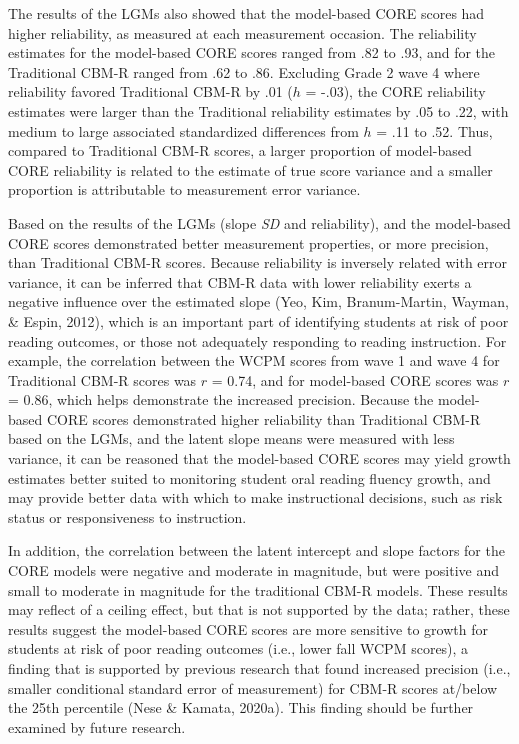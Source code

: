 \documentclass[
  english,
  man, fleqn, noextraspace]{apa6}
\begin{document}
The results of the LGMs also showed that the model-based CORE scores had higher reliability, as measured at each measurement occasion. The reliability estimates for the model-based CORE scores ranged from .82 to .93, and for the Traditional CBM-R ranged from .62 to .86. Excluding Grade 2 wave 4 where reliability favored Traditional CBM-R by .01 (\(h\) = -.03), the CORE reliability estimates were larger than the Traditional reliability estimates by .05 to .22, with medium to large associated standardized differences from \(h\) = .11 to .52. Thus, compared to Traditional CBM-R scores, a larger proportion of model-based CORE reliability is related to the estimate of true score variance and a smaller proportion is attributable to measurement error variance.

Based on the results of the LGMs (slope \emph{SD} and reliability), and the model-based CORE scores demonstrated better measurement properties, or more precision, than Traditional CBM-R scores. Because reliability is inversely related with error variance, it can be inferred that CBM-R data with lower reliability exerts a negative influence over the estimated slope (Yeo, Kim, Branum-Martin, Wayman, \& Espin, 2012), which is an important part of identifying students at risk of poor reading outcomes, or those not adequately responding to reading instruction. For example, the correlation between the WCPM scores from wave 1 and wave 4 for Traditional CBM-R scores was \(r\) = 0.74, and for model-based CORE scores was \(r\) = 0.86, which helps demonstrate the increased precision. Because the model-based CORE scores demonstrated higher reliability than Traditional CBM-R based on the LGMs, and the latent slope means were measured with less variance, it can be reasoned that the model-based CORE scores may yield growth estimates better suited to monitoring student oral reading fluency growth, and may provide better data with which to make instructional decisions, such as risk status or responsiveness to instruction.

In addition, the correlation between the latent intercept and slope factors for the CORE models were negative and moderate in magnitude, but were positive and small to moderate in magnitude for the traditional CBM-R models. These results may reflect of a ceiling effect, but that is not supported by the data; rather, these results suggest the model-based CORE scores are more sensitive to growth for students at risk of poor reading outcomes (i.e., lower fall WCPM scores), a finding that is supported by previous research that found increased precision (i.e., smaller conditional standard error of measurement) for CBM-R scores at/below the 25th percentile (Nese \& Kamata, 2020a). This finding should be further examined by future research.
\end{document}
